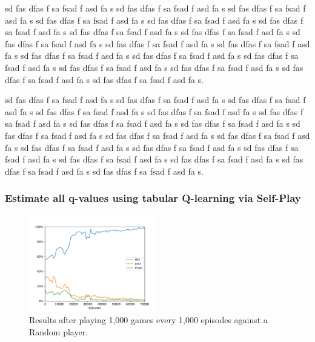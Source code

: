 \documentclass{article}
\newcommand{\GithubURL}[1]{[\href{https://github.com/davidrobles/mlnd-capstone-code/blob/master/#1}{source}]}
\begin{document}
sd fas dfas f sa fsad f asd fa s sd fas dfas f sa fsad f asd fa s sd fas dfas f sa fsad f asd fa s
sd fas dfas f sa fsad f asd fa s sd fas dfas f sa fsad f asd fa s sd fas dfas f sa fsad f asd fa s
sd fas dfas f sa fsad f asd fa s sd fas dfas f sa fsad f asd fa s sd fas dfas f sa fsad f asd fa s
sd fas dfas f sa fsad f asd fa s sd fas dfas f sa fsad f asd fa s sd fas dfas f sa fsad f asd fa s
sd fas dfas f sa fsad f asd fa s sd fas dfas f sa fsad f asd fa s sd fas dfas f sa fsad f asd fa s
sd fas dfas f sa fsad f asd fa s sd fas dfas f sa fsad f asd fa s sd fas dfas f sa fsad f asd fa s.

sd fas dfas f sa fsad f asd fa s sd fas dfas f sa fsad f asd fa s sd fas dfas f sa fsad f asd fa s
sd fas dfas f sa fsad f asd fa s sd fas dfas f sa fsad f asd fa s sd fas dfas f sa fsad f asd fa s
sd fas dfas f sa fsad f asd fa s sd fas dfas f sa fsad f asd fa s sd fas dfas f sa fsad f asd fa s
sd fas dfas f sa fsad f asd fa s sd fas dfas f sa fsad f asd fa s sd fas dfas f sa fsad f asd fa s
sd fas dfas f sa fsad f asd fa s sd fas dfas f sa fsad f asd fa s sd fas dfas f sa fsad f asd fa s
sd fas dfas f sa fsad f asd fa s sd fas dfas f sa fsad f asd fa s sd fas dfas f sa fsad f asd fa s.

\subsubsection{Estimate all q-values using tabular Q-learning via Self-Play}


\begin{figure}[!h]
    \centering
    \includegraphics[width=0.50\textwidth]{figures/tic_ql_tab_full_selfplay_wld_plot.pdf}
    \caption{Results after playing 1,000 games every 1,000 episodes against a Random player.}
    \label{fig:tic-ql-tab-full-selfplay-wld-plot}
\end{figure}
\end{document}
